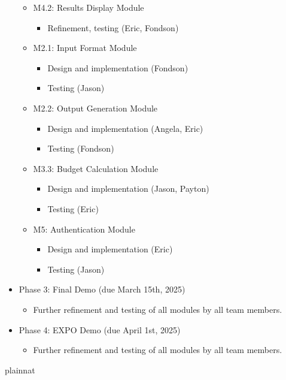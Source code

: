\documentclass[12pt, titlepage]{article}
\begin{document}
\begin{itemize}
\begin{itemize}
\begin{itemize}
		\end{itemize}
		\item M4.2: Results Display Module
		\begin{itemize}
			\item Refinement, testing (Eric, Fondson)
		\end{itemize}
		\item M2.1: Input Format Module
		\begin{itemize}
			\item Design and implementation (Fondson)
			\item Testing (Jason)
		\end{itemize}
		\item M2.2: Output Generation Module
		\begin{itemize}
			\item Design and implementation (Angela, Eric)
			\item Testing (Fondson)
		\end{itemize}
		\item M3.3: Budget Calculation Module
		\begin{itemize}
			\item Design and implementation (Jason, Payton)
			\item Testing (Eric)
		\end{itemize}
    \item M5: Authentication Module
    \begin{itemize}
        \item Design and implementation (Eric)
        \item Testing (Jason)
    \end{itemize}
	\end{itemize}
	\item Phase 3: Final Demo (due March 15th, 2025)
	\begin{itemize}
		\item Further refinement and testing of all modules by all team members.
	\end{itemize}
	\item Phase 4: EXPO Demo (due April 1st, 2025)
	\begin{itemize}
		\item Further refinement and testing of all modules by all team members.
	\end{itemize}
\end{itemize}

\newpage

 {plainnat}


\newpage{}
\end{document}
